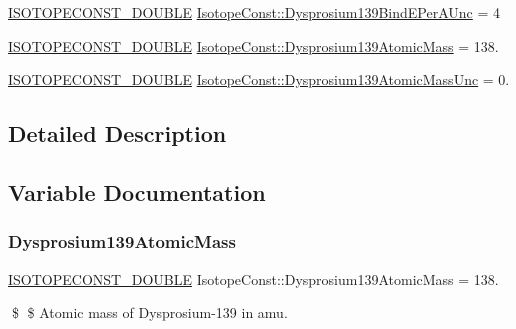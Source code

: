 \begin{DoxyCompactItemize}
\mbox{\hyperlink{group___isotope_const-_macros_ga8f45a7272ce02c0b4c65c44636ed719a}{I\+S\+O\+T\+O\+P\+E\+C\+O\+N\+S\+T\+\_\+\+D\+O\+U\+B\+LE}} \mbox{\hyperlink{group___isotope_const-_dysprosium-_dy139_ga93c0d417dded512ddbbfe5bdae77abda}{Isotope\+Const\+::\+Dysprosium139\+Bind\+E\+Per\+A\+Unc}} = 4
\item 
\mbox{\hyperlink{group___isotope_const-_macros_ga8f45a7272ce02c0b4c65c44636ed719a}{I\+S\+O\+T\+O\+P\+E\+C\+O\+N\+S\+T\+\_\+\+D\+O\+U\+B\+LE}} \mbox{\hyperlink{group___isotope_const-_dysprosium-_dy139_gaabb60ddcbeefdcc2511aaba12c78a160}{Isotope\+Const\+::\+Dysprosium139\+Atomic\+Mass}} = 138.
\item 
\mbox{\hyperlink{group___isotope_const-_macros_ga8f45a7272ce02c0b4c65c44636ed719a}{I\+S\+O\+T\+O\+P\+E\+C\+O\+N\+S\+T\+\_\+\+D\+O\+U\+B\+LE}} \mbox{\hyperlink{group___isotope_const-_dysprosium-_dy139_ga2dbf720481eb2ec2145dee28b4d4e309}{Isotope\+Const\+::\+Dysprosium139\+Atomic\+Mass\+Unc}} = 0.
\end{DoxyCompactItemize}


\subsection{Detailed Description}


\subsection{Variable Documentation}
\mbox{\label{group___isotope_const-_dysprosium-_dy139_gaabb60ddcbeefdcc2511aaba12c78a160}} 
\subsubsection{\texorpdfstring{Dysprosium139\+Atomic\+Mass}{Dysprosium139AtomicMass}}
{\footnotesize\ttfamily \mbox{\hyperlink{group___isotope_const-_macros_ga8f45a7272ce02c0b4c65c44636ed719a}{I\+S\+O\+T\+O\+P\+E\+C\+O\+N\+S\+T\+\_\+\+D\+O\+U\+B\+LE}} Isotope\+Const\+::\+Dysprosium139\+Atomic\+Mass = 138.}

\$ \$ Atomic mass of Dysprosium-\/139 in amu. \mbox{\label{group___isotope_const-_dysprosium-_dy139_ga2dbf720481eb2ec2145dee28b4d4e309}} 
